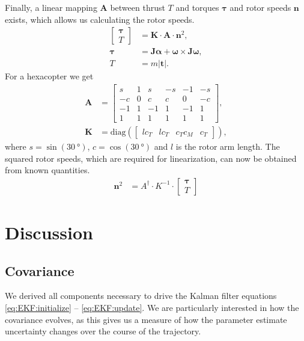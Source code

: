 \documentclass[10pt,a4paper]{article}
\newcommand{\kthr}{c_T}
\newcommand{\kmom}{c_M}
\begin{document}
Finally, a linear mapping $\mathbf{A}$ between thrust $T$ and torques $\boldsymbol{\tau}$ and rotor speeds $\mathbf{n}$ exists, which allows us calculating the rotor speeds.
\begin{align}
\begin{bmatrix}
 \boldsymbol{\tau} \\ T 
\end{bmatrix} &= \mathbf{K} \cdot \mathbf{A} \cdot \mathbf{n}^2, \\
\boldsymbol{\tau} &= \mathbf{J} \boldsymbol{\alpha} + \boldsymbol{\omega} \times \mathbf{J} \boldsymbol{\omega}, \\
T &= m |\mathbf{t}|.
\end{align}
For a hexacopter we get
\begin{align}
\mathbf{A} &= \begin{bmatrix}
s & 1 & s & -s & -1 & -s \\
-c & 0 & c & c & 0 & -c \\
-1 & 1 & -1 & 1 & -1 & 1 \\
1 & 1 & 1 & 1 & 1 & 1
\end{bmatrix}, \\
\mathbf{K} &= \mathrm{diag} \left( \begin{bmatrix}
l \kthr  & l \kthr & \kthr \kmom & \kthr
\end{bmatrix} \right),
\end{align}
where $s = \sin (\SI{30}{\degree})$, $c = \cos (\SI{30}{\degree})$ and $l$ is the rotor arm length. The squared rotor speeds, which are required for linearization, can now be obtained from known quantities.
\begin{align}
\mathbf{n}^2 &=  A^\dagger \cdot K^{-1} \cdot \begin{bmatrix}
 \boldsymbol{\tau} \\ T 
\end{bmatrix}
\end{align}

\section{Discussion}

\subsection*{Covariance}
We derived all components necessary to drive the Kalman filter equations \ref{eq:EKF:initialize} -- \ref{eq:EKF:update}. We are particularly interested in how the covariance evolves, as this gives us a measure of how the parameter estimate uncertainty changes over the course of the trajectory. 
\end{document}
